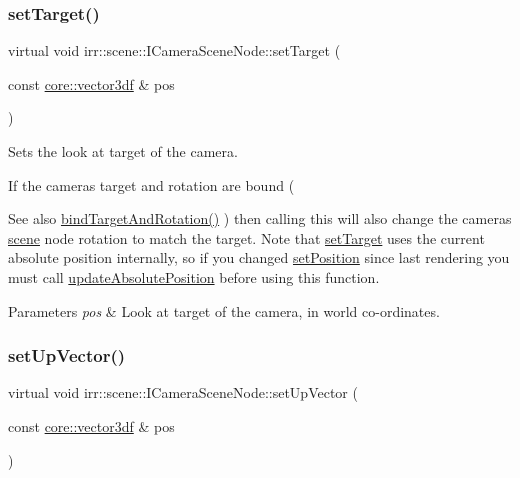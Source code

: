 \subsubsection{\texorpdfstring{set\+Target()}{setTarget()}\hspace{0.1cm}{\footnotesize\ttfamily [2/2]}}
{\footnotesize\ttfamily virtual void irr\+::scene\+::\+I\+Camera\+Scene\+Node\+::set\+Target (\begin{DoxyParamCaption}\item[{const \hyperlink{namespaceirr_1_1core_ae6e2b2a6c552833ebbd5b7463d03586b}{core\+::vector3df} \&}]{pos }\end{DoxyParamCaption})\hspace{0.3cm}{\ttfamily [pure virtual]}}



Sets the look at target of the camera. 

If the camera\textquotesingle{}s target and rotation are bound ( \begin{DoxySeeAlso}{See also}
\hyperlink{classirr_1_1scene_1_1ICameraSceneNode_ad8785d7b2f730933a8d4425ac54e7205}{bind\+Target\+And\+Rotation()} ) then calling this will also change the camera\textquotesingle{}s \hyperlink{namespaceirr_1_1scene}{scene} node rotation to match the target. Note that \hyperlink{classirr_1_1scene_1_1ICameraSceneNode_a7280b07fd7915c64350db5a132b4ba07}{set\+Target} uses the current absolute position internally, so if you changed \hyperlink{classirr_1_1scene_1_1ISceneNode_a2166eb0a92cc0e46c49266f41a68ed50}{set\+Position} since last rendering you must call \hyperlink{classirr_1_1scene_1_1ISceneNode_aeb6e0dc034bb2101600ce87acbcf0f6e}{update\+Absolute\+Position} before using this function. 
\end{DoxySeeAlso}

\begin{DoxyParams}{Parameters}
{\em pos} & Look at target of the camera, in world co-\/ordinates. \\
\hline
\end{DoxyParams}
\mbox{\label{classirr_1_1scene_1_1ICameraSceneNode_a1e74c17d89979fde4738276ccdcc0d3a}} 
\subsubsection{\texorpdfstring{set\+Up\+Vector()}{setUpVector()}\hspace{0.1cm}{\footnotesize\ttfamily [1/2]}}
{\footnotesize\ttfamily virtual void irr\+::scene\+::\+I\+Camera\+Scene\+Node\+::set\+Up\+Vector (\begin{DoxyParamCaption}\item[{const \hyperlink{namespaceirr_1_1core_ae6e2b2a6c552833ebbd5b7463d03586b}{core\+::vector3df} \&}]{pos }\end{DoxyParamCaption})\hspace{0.3cm}{\ttfamily [pure virtual]}}



